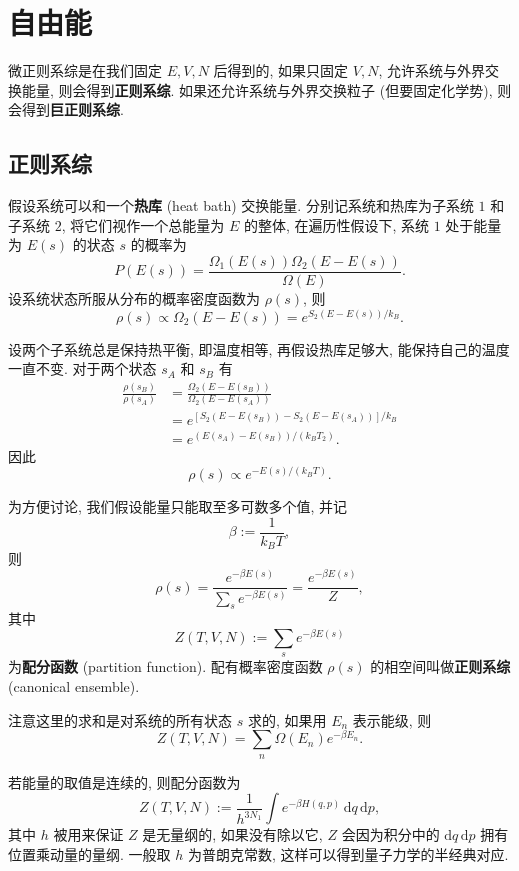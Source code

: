 \section{自由能}
微正则系综是在我们固定 $ E,V,N $ 后得到的, 如果只固定 $ V,N $, 允许系统与外界交换能量, 则会得到{\bf 正则系综}. 如果还允许系统与外界交换粒子 (但要固定化学势), 则会得到{\bf 巨正则系综}.

\subsection{正则系综}
假设系统可以和一个{\bf 热库} (heat bath) 交换能量. 分别记系统和热库为子系统 $ 1 $ 和子系统 $ 2 $, 将它们视作一个总能量为 $ E $ 的整体, 在遍历性假设下, 系统 $ 1 $ 处于能量为 $ E(s) $ 的状态 $ s $ 的概率为
\[ P(E(s))=\frac{\Omega_1(E(s))\Omega_2(E-E(s))}{\Omega(E)}. \]
设系统状态所服从分布的概率密度函数为 $ \rho(s) $, 则
\[ \rho(s)\propto\Omega_2(E-E(s))=e^{S_2(E-E(s))/k_B}. \]

设两个子系统总是保持热平衡, 即温度相等, 再假设热库足够大, 能保持自己的温度一直不变. 对于两个状态 $ s_A $ 和 $ s_B $ 有
\begin{align*}
    \frac{\rho(s_B)}{\rho(s_A)} &= \frac{\Omega_2(E-E(s_B))}{\Omega_2(E-E(s_A))}\\ 
    &= e^{[S_2(E-E(s_B))-S_2(E-E(s_A))]/k_B}\\ 
    &= e^{(E(s_A)-E(s_B))/(k_BT_2)}.
\end{align*}
因此
\[ \rho(s)\propto e^{-E(s)/(k_BT)}. \]

为方便讨论, 我们假设能量只能取至多可数多个值, 并记 
\[ \beta:=\frac{1}{k_BT}, \] 
则
\[ \rho(s)=\frac{e^{-\beta E(s)}}{\sum_{s}e^{-\beta E(s)}}=\frac{e^{-\beta E(s)}}{Z}, \]
其中
\[ Z(T,V,N):=\sum_{s}e^{-\beta E(s)} \]
为{\bf 配分函数} (partition function). 配有概率密度函数 $ \rho(s) $ 的相空间叫做{\bf 正则系综} (canonical ensemble).
\begin{remark}
    注意这里的求和是对系统的所有状态 $s$ 求的, 如果用 $E_n$ 表示能级, 则
    \[ Z(T,V,N)=\sum_{n}\Omega(E_n)e^{-\beta E_n}. \] 
\end{remark}
\begin{remark}
    若能量的取值是连续的, 则配分函数为
    \[ Z(T,V,N):=\frac{1}{h^{3N_1}}\int e^{-\beta H(q,p)}\,\mathrm{d}q\,\mathrm{d}p, \]
    其中 $ h $ 被用来保证 $ Z $ 是无量纲的, 如果没有除以它, $ Z $ 会因为积分中的 $ \mathrm{d}q\,\mathrm{d}p $ 拥有位置乘动量的量纲. 一般取 $ h $ 为普朗克常数, 这样可以得到量子力学的半经典对应.
\end{remark}


